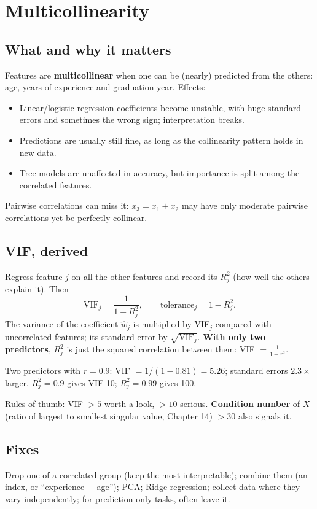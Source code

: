 \section{Multicollinearity}
\subsection{What and why it matters}
Features are \textbf{multicollinear} when one can be (nearly) predicted from the others: age, years of experience and graduation year. Effects:
\begin{itemize}
\item Linear/logistic regression coefficients become unstable, with huge standard errors and sometimes the wrong sign; interpretation breaks.
\item Predictions are usually still fine, as long as the collinearity pattern holds in new data.
\item Tree models are unaffected in accuracy, but importance is split among the correlated features.
\end{itemize}
Pairwise correlations can miss it: $x_3 = x_1 + x_2$ may have only moderate pairwise correlations yet be perfectly collinear.

\subsection{VIF, derived}
Regress feature $j$ on all the other features and record its $R_j^2$ (how well the others explain it). Then
\[ \text{VIF}_j = \frac{1}{1 - R_j^2},\qquad \text{tolerance}_j = 1 - R_j^2. \]
The variance of the coefficient $\hat w_j$ is multiplied by VIF$_j$ compared with uncorrelated features; its standard error by $\sqrt{\text{VIF}_j}$.
\textbf{With only two predictors}, $R_j^2$ is just the squared correlation between them: VIF $= \frac{1}{1 - r^2}$.
\begin{example}
Two predictors with $r = 0.9$: VIF $= 1/(1 - 0.81) = 5.26$; standard errors $2.3\times$ larger. $R_j^2 = 0.9$ gives VIF 10; $R_j^2 = 0.99$ gives 100.
\end{example}
Rules of thumb: VIF $>5$ worth a look, $>10$ serious. \textbf{Condition number} of $X$ (ratio of largest to smallest singular value, Chapter 14) $>30$ also signals it.

\subsection{Fixes}
Drop one of a correlated group (keep the most interpretable); combine them (an index, or ``experience $-$ age''); PCA; Ridge regression; collect data where they vary
independently; for prediction-only tasks, often leave it.

